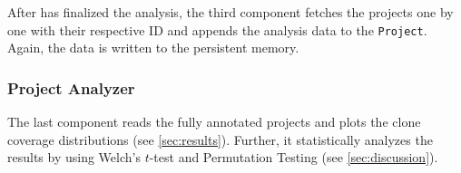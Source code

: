 After \teamscale{} has finalized the analysis, the third component fetches the projects one by one with their respective ID and appends the analysis data to the \texttt{Project}. Again, the data is written to the persistent memory.

\subsubsection{Project Analyzer}

The last component reads the fully annotated projects and plots the clone coverage distributions (see \autoref{sec:results}). Further, it statistically analyzes the results by using Welch's $t$-test and Permutation Testing (see \autoref{sec:discussion}).